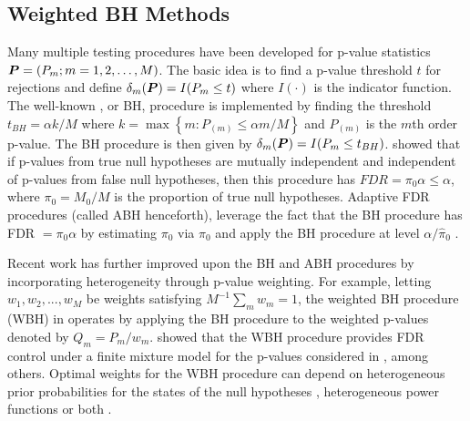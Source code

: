 \documentclass[bimj,fleqn]{w-art}
\newcommand{\bP}{{\mbox{\boldmath $P$}}}
\theoremstyle{plain}
\theoremstyle{definition}
\begin{document}
\subsection{Weighted BH Methods}
Many multiple testing procedures have been developed for p-value statistics $\bP = (P_m; m = 1, 2,\ldots, M)$.  The basic idea is to find a p-value threshold $t$ for rejections and define $\delta_m(\bP) = I(P_m \leq t)$ where $I(\cdot)$ is the indicator function.  The well-known \cite{Benjamini1995}, or BH, procedure is implemented by finding the threshold $t_{BH} = \alpha k/M$ where $k = \max\left\{m:P_{(m)}\leq \alpha m/M\right\}$ and $P_{(m)}$ is the $m$th order p-value.  The BH procedure is then given by $\delta_m(\bP) = I(P_m \leq t_{BH})$. \cite{Benjamini1995} showed that if p-values from true null hypotheses are mutually independent and independent of p-values from false null hypotheses, then this procedure has $FDR = \pi_0 \alpha \leq \alpha$, where $\pi_0 = M_0/M$ is the proportion of true null hypotheses. Adaptive FDR procedures (called ABH henceforth), leverage the fact that the BH procedure has FDR $=\pi_0\alpha$ by estimating $\pi_0$ via $\hat{\pi}_0$ and apply the BH procedure at level $\alpha/\hat\pi_0$ \citep{Storey2004}. 


Recent work has further improved upon the BH and ABH procedures by incorporating heterogeneity through p-value weighting.  For example, letting $w_1, w_2, ..., w_M$ be weights satisfying $M^{-1}\sum_mw_m = 1$, the weighted BH procedure (WBH) in \cite{Gen06} operates by applying the BH procedure to the weighted p-values denoted by $Q_m = P_m/w_m$. \cite{Roeder2009} showed that the WBH procedure provides FDR control under a finite mixture model for the p-values considered in \cite{Genovese2002}, among others. Optimal weights for the WBH procedure can depend on heterogeneous prior probabilities for the states of the null hypotheses \citep{Roeder2009,Hu2010,LiBar17,Lihua2018,Xianyang20,LiBar19}, heterogeneous power functions \citep{Pena2011} or both \citep{Cai2009,Habiger2017, Ignatiadis2021}.  
\end{document}
